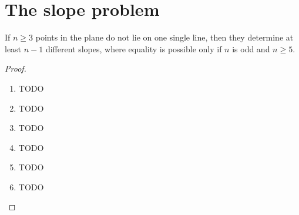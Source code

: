 \chapter{The slope problem}

\begin{theorem}
  \label{slope_problem}
  If \(n\ge 3\) points in the plane do not lie on one single line,
  then they determine at least \(n - 1\) different slopes, where equality is
  possible only if \(n\) is odd and \(n \ge 5\).
\end{theorem}
\begin{proof}
  \begin{enumerate}
    \item TODO
    \item TODO
    \item TODO
    \item TODO
    \item TODO
    \item TODO
  \end{enumerate}
\end{proof}
